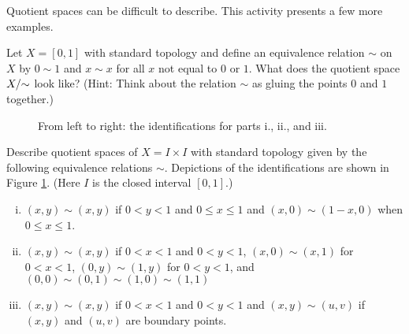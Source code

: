 \begin{activity} Quotient spaces can be difficult to describe. This activity presents a few more examples. 
\ba
\item Let $X = [0, 1]$ with standard topology and define an equivalence relation $\sim$ on $X$ by $0 \sim 1$ and $x \sim x$ for all $x$ not equal to $0$ or $1$. What does the quotient space $X/\hspace{-1mm}\sim$ look like? (Hint: Think about the relation $\sim$ as gluing the points $0$ and $1$ together.)

\begin{figure}[h]
\begin{center}
 \hspace{0.5in}  \hspace{0.5in}  
\caption{From left to right: the identifications for parts i., ii., and iii.} 
\label{F:Quotients_activity}
\end{center}
\end{figure}

\item Describe quotient spaces of $X = I \times I$ with standard topology given by the following equivalence relations $\sim$. Depictions of the identifications are shown in Figure \ref{F:Quotients_activity}. (Here $I$ is the closed interval $[0,1]$.)
	\begin{enumerate}[i.]
	\item $(x, y) \sim (x,y)$ if $0 < y < 1$ and $0 \leq x \leq 1$ and $(x,0) \sim (1-x,0)$ when $0 \leq x \leq 1$. 
	
	\item $(x, y) \sim (x,y)$ if $0 < x < 1$ and $0 < y < 1$, $(x,0) \sim (x,1)$ for $0 < x < 1$, $(0,y) \sim (1,y)$ for $0 < y < 1$, and $(0,0) \sim (0,1) \sim (1,0) \sim(1,1)$
	
	\item  $(x, y) \sim (x,y)$ if $0 < x < 1$ and $0 < y < 1$ and $(x,y) \sim (u,v)$ if $(x,y)$ and $(u,v)$ are boundary points.
	
	\end{enumerate}
	
\ea

\end{activity}

